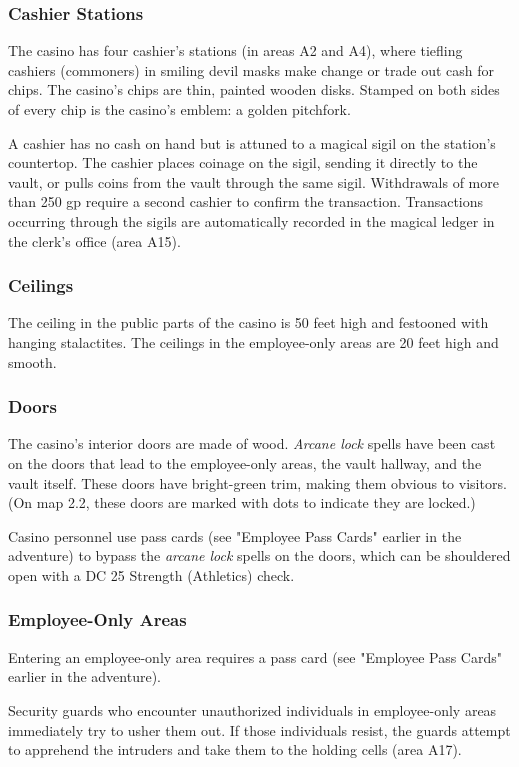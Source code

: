 \documentclass[10pt,a4paper,twoside,bg=print,twocolumn,openany,nodeprecatedcode]{dndbook}
\begin{document}
\subsubsection{Cashier Stations}
The casino has four cashier's stations (in areas A2 and A4), where tiefling cashiers (commoners) in smiling devil masks make change or trade out cash for chips. The casino's chips are thin, painted wooden disks. Stamped on both sides of every chip is the casino's emblem: a golden pitchfork.

A cashier has no cash on hand but is attuned to a magical sigil on the station's countertop. The cashier places coinage on the sigil, sending it directly to the vault, or pulls coins from the vault through the same sigil. Withdrawals of more than 250 gp require a second cashier to confirm the transaction. Transactions occurring through the sigils are automatically recorded in the magical ledger in the clerk's office (area A15).

\subsubsection{Ceilings}
The ceiling in the public parts of the casino is 50 feet high and festooned with hanging stalactites. The ceilings in the employee-only areas are 20 feet high and smooth.

\subsubsection{Doors}
The casino's interior doors are made of wood. \textit{Arcane lock} spells have been cast on the doors that lead to the employee-only areas, the vault hallway, and the vault itself. These doors have bright-green trim, making them obvious to visitors. (On map 2.2, these doors are marked with dots to indicate they are locked.)

Casino personnel use pass cards (see "Employee Pass Cards" earlier in the adventure) to bypass the \textit{arcane lock} spells on the doors, which can be shouldered open with a DC 25 Strength (Athletics) check.

\subsubsection{Employee-Only Areas}
Entering an employee-only area requires a pass card (see "Employee Pass Cards" earlier in the adventure).

Security guards who encounter unauthorized individuals in employee-only areas immediately try to usher them out. If those individuals resist, the guards attempt to apprehend the intruders and take them to the holding cells (area A17).
\end{document}
